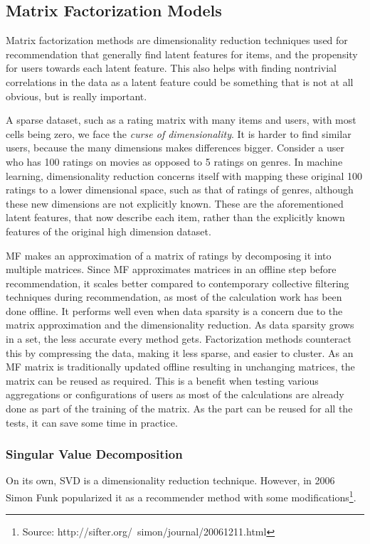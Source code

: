 \subsection{Matrix Factorization Models} \label{bg:sub:factorizationmodels}
Matrix factorization methods are dimensionality reduction techniques used for recommendation that generally find latent features for items, and the propensity for users towards each latent feature. This also helps with finding nontrivial correlations in the data as a latent feature could be something that is not at all obvious, but is really important.

A sparse dataset, such as a rating matrix with many items and users, with most cells being zero, we face the \textit{curse of dimensionality}. It is harder to find similar users, because the many dimensions makes differences bigger. Consider a user who has 100 ratings on movies as opposed to 5 ratings on genres. In machine learning, dimensionality reduction concerns itself with mapping these original 100 ratings to a lower dimensional space, such as that of ratings of genres, although these new dimensions are not explicitly known. These are the aforementioned latent features, that now describe each item, rather than the explicitly known features of the original high dimension dataset\cite{recsys_dimensionalityreduction}.

MF makes an approximation of a matrix of ratings by decomposing it into multiple matrices. Since MF approximates matrices in an offline step before recommendation, it scales better compared to contemporary collective filtering techniques during recommendation, as most of the calculation work has been done offline. It performs well even when data sparsity is a concern due to the matrix approximation and the dimensionality reduction.
As data sparsity grows in a set, the less accurate every method gets. Factorization methods counteract this by compressing the data, making it less sparse, and easier to cluster.
As an MF matrix is traditionally updated offline resulting in unchanging matrices, the matrix can be reused as required. This is a benefit when testing various aggregations or configurations of users as most of the calculations are already done as part of the training of the matrix. As the part can be reused for all the tests, it can save some time in practice.

\subsubsection{Singular Value Decomposition}
On its own, SVD is a dimensionality reduction technique. However, in 2006 Simon Funk popularized it as a recommender method with some modifications\footnote{Source: http://sifter.org/~simon/journal/20061211.html}.

